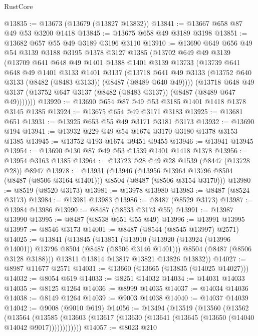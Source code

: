 \begin{lexlean}{RustCore}
\begin{coremodule}
@13835 := @13673 (@13679 (@13827 @13832))
@13841 := @13667 @658 @87 @49 @53 @3200 @1418
@13845 := @13675 @658 @49 @3189 @3198
@13851 := @13682 @657 @55 @49 @3189 @3196 @3110
@13910 := @13690
    @649
    @656
    @49
    @54
    @3139
    @3188
    @3195
    @1378
    @3127
    @1385
    (@13702
      @649
      @49
      @3139
      (@13709
        @641
        @648
        @49
        @1401
        @1388
        @1401
        @3139
        @13733
        (@13739
          @641
          @648
          @49
          @1401
          @3133
          @1401
          @3137
          (@13718 @641 @49 @3133 (@13752 @640 @3133 (@8482 (@8483 @3133)) (@8487 (@8489 @640 @49))))
          (@13718
            @648
            @49
            @3137
            (@13752 @647 @3137 (@8482 (@8483 @3137)) (@8487 (@8489 @647 @49)))))))
@13920 := @13690 @654 @87 @49 @53 @3185 @1401 @1418 @1378 @3145 @1385
@13924 := @13675 @654 @49 @3171 @3183
@13925 := @13681 @651
@13931 := @13925 @653 @55 @49 @3171 @3181 @3173
@13932 := @13690 @194
@13941 := @13932 @229 @49 @54 @1674 @3170 @3180 @1378 @3153 @1385
@13945 := @13752 @193 @1674 @9451 @9455
@13946 := @13941 @13945
@13954 := @13690 @130 @87 @49 @53 @1539 @1401 @1418 @1378
@13956 := @13954 @3163 @1385
@13964 := @13723 @28 @49 @28 @1539 (@8447 (@13728 @28)) @8947
@13978 := @13931
    (@13946
      (@13956 @13964 @13796 @8504 (@8487 (@8506 @3164 @1401)))
      @8504
      (@8487 (@8506 @3154 @3170)))
@13980 := @8519 (@8520 @3173)
@13981 := @13978 @13980
@13983 := @8487 (@8524 @3173)
@13984 := @13981 @13983
@13986 := @8487 (@8529 @3173)
@13987 := @13984 @13986
@13990 := @8487 (@8533 @3173 @55)
@13991 := @13987 @13990
@13995 := @8487 (@8538 @651 @55 @49)
@13996 := @13991 @13995
@13997 := @8546 @3173
@14001 := @8487 (@8544 (@8545 @13997) @2571)
@14025 := @13841
    (@13845
      (@13851
        (@13910
          (@13920 (@13924 (@13996 @14001)) @13796 @8504 (@8487 (@8506 @3146 @1401)))
          @8504
          (@8487 (@8506 @3128 @3188)))
        @13811
        @13814
        @13817
        @13821
        @13826
        @13832))
@14027 := @8987 @11677 @2571
@14031 := @13660 (@13665 (@13835 (@14025 @14027)))
@14032 := @8054 @619
@14033 := @8251 @14032
@14034 := @14031 @14033
@14035 := @8125 @1264
@14036 := @8999 @14035
@14037 := @14034 @14036
@14038 := @8149 @1264
@14039 := @9003 @14038
@14040 := @14037 @14039
@14042 := @9008 (@9010 @619)
@14056 := @13494
    (@13519
      (@13560
        (@13562
          (@13564
            (@13585 (@13603 (@13617 (@13630 (@13641 (@13645 (@13650 (@14040 @14042 @9017))))))))))))
@14057 := @8023 @210

\end{coremodule}
\end{lexlean}

